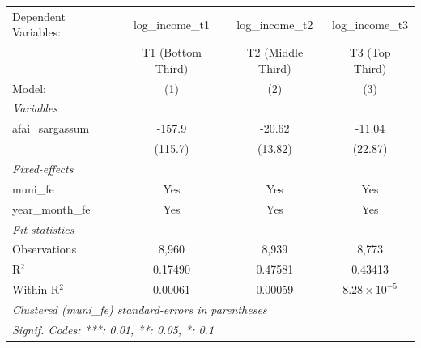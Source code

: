 \begingroup
\centering
\begin{tabular}{lccc}
   \tabularnewline \midrule \midrule
   Dependent Variables: & log\_income\_t1   & log\_income\_t2   & log\_income\_t3\\    
                        & T1 (Bottom Third) & T2 (Middle Third) & T3 (Top Third) \\   
   Model:               & (1)               & (2)               & (3)\\  
   \midrule
   \emph{Variables}\\
   afai\_sargassum      & -157.9            & -20.62            & -11.04\\   
                        & (115.7)           & (13.82)           & (22.87)\\   
   \midrule
   \emph{Fixed-effects}\\
   muni\_fe             & Yes               & Yes               & Yes\\  
   year\_month\_fe      & Yes               & Yes               & Yes\\  
   \midrule
   \emph{Fit statistics}\\
   Observations         & 8,960             & 8,939             & 8,773\\  
   R$^2$                & 0.17490           & 0.47581           & 0.43413\\  
   Within R$^2$         & 0.00061           & 0.00059           & $8.28\times 10^{-5}$\\   
   \midrule \midrule
   \multicolumn{4}{l}{\emph{Clustered (muni\_fe) standard-errors in parentheses}}\\
   \multicolumn{4}{l}{\emph{Signif. Codes: ***: 0.01, **: 0.05, *: 0.1}}\\
\end{tabular}
\par\endgroup
